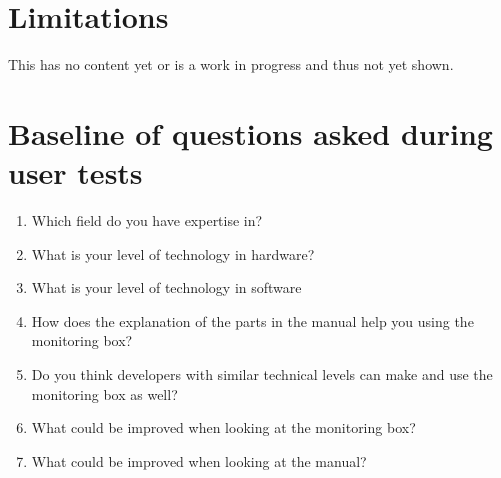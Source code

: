 \documentclass[conference]{IEEEtran}
\begin{document}
\section{Limitations}
This has no content yet or is a work in progress and thus not yet shown.





\appendices
\section{Baseline of questions asked during user tests}
\begin{enumerate}
\item Which field do you have expertise in?
\item What is your level of technology in hardware?
\item What is your level of technology in software
\item How does the explanation of the parts in the manual help you using the monitoring box?
\item Do you think developers with similar technical levels can make and use the monitoring box as well?\item What could be improved when looking at the monitoring box?
\item What could be improved when looking at the manual?
\end{enumerate}
\end{document}
